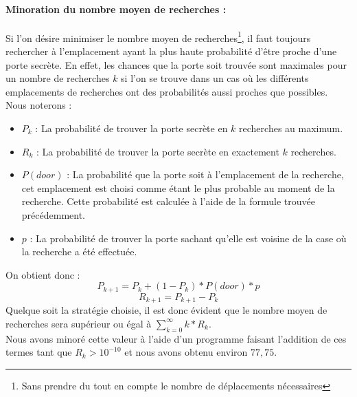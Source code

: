 \documentclass[a4paper,12pt]{article}
\begin{document}
\paragraph{Minoration du nombre moyen de recherches :}
Si l'on désire minimiser le nombre moyen de recherches\footnote{Sans prendre du
  tout en compte le nombre de déplacements nécessaires}, il faut toujours
rechercher à l'emplacement ayant la plus haute probabilité d'être proche d'une
porte secrète. En effet, les chances que la porte soit trouvée sont maximales
pour un nombre de recherches $k$ si l'on se trouve dans un cas où les différents
emplacements de recherches ont des probabilités aussi proches que possibles.
\\
Nous noterons :
\begin{itemize}
\item $P_k$ : La probabilité de trouver la porte secrète en $k$ recherches au
  maximum.
\item $R_k$ : La probabilité de trouver la porte secrète en exactement $k$
  recherches.
\item $P(door)$ : La probabilité que la porte soit à l'emplacement de la
  recherche, cet emplacement est choisi comme étant le plus probable au moment
  de la recherche. Cette probabilité est calculée à l'aide de la formule trouvée
  précédemment.
\item $p$ : La probabilité de trouver la porte sachant qu'elle est voisine de la
  case où la recherche a été effectuée.
\end{itemize}
On obtient donc :
$$P_{k+1} = P_k + (1 - P_k) * P(door) * p$$
$$R_{k+1} = P_{k+1} - P_{k}$$
Quelque soit la stratégie choisie, il est donc évident que le nombre moyen de
recherches sera supérieur ou égal à $\sum\limits_{k=0}^{\infty} k * R_k$.
\\
Nous avons minoré cette valeur à l'aide d'un programme faisant l'addition de ces
termes tant que $R_k > 10^{-10}$ et nous avons obtenu environ $77,75$.
\end{document}
